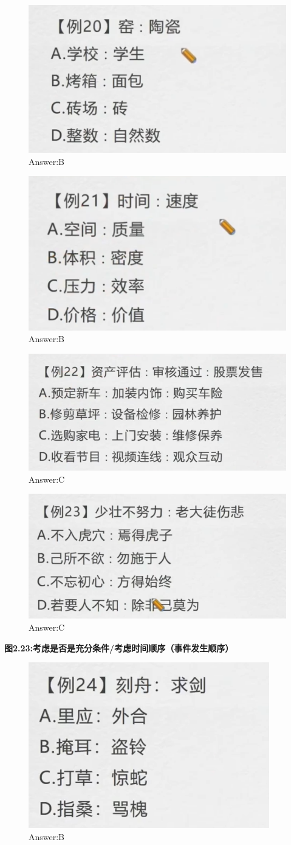 \documentclass{article}
\numberwithin{equation}{section}						%
\numberwithin{figure}{section}							%
\begin{document}
\begin{sloppypar}
\begin{figure}[H]
     \centering
     \includegraphics[width=0.4\linewidth]{120.png}
		\caption{Answer:B}
\end{figure}


\begin{figure}[H]
     \centering
     \includegraphics[width=0.4\linewidth]{121.png}
		\caption{Answer:B}
\end{figure}


\begin{figure}[H]
     \centering
     \includegraphics[width=0.4\linewidth]{122.png}
		\caption{Answer:C}
\end{figure}


\begin{figure}[H]
     \centering
     \includegraphics[width=0.4\linewidth]{123.png}
		\caption{Answer:C}
\end{figure}

\textbf{图2.23:考虑是否是充分条件/考虑时间顺序（事件发生顺序）}

\begin{figure}[H]
     \centering
     \includegraphics[width=0.4\linewidth]{124.png}
		\caption{Answer:B}
\end{figure}



\end{sloppypar}
\end{document}
